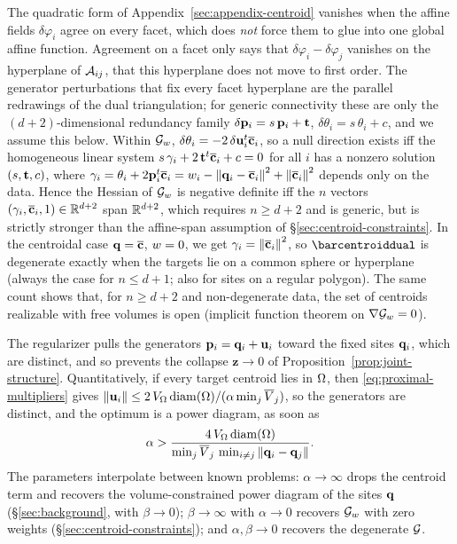 \documentclass[main.tex]{subfiles}
\providecommand{\gen}{\mathbf{z}}                %
\begin{document}
\begin{remark}
\label{rem:centroid-kernel}
The quadratic form of Appendix~\ref{sec:appendix-centroid} vanishes when the affine fields $\delta\varphi_i$ agree on every facet, which does \emph{not} force them to glue into one global affine function.
Agreement on a facet only says that $\delta\varphi_i - \delta\varphi_j$ vanishes on the hyperplane of $\mathcal{A}_{ij}$, \ie that this hyperplane does not move to first order.
The generator perturbations that fix every facet hyperplane are the parallel redrawings of the dual triangulation; for generic connectivity these are only the $(d\!+\!2)$-dimensional redundancy family $\delta\mathbf{p}_i = s\,\mathbf{p}_i + \mathbf{t}$, $\delta\theta_i = s\,\theta_i + c$, and we assume this below.
Within $\mathcal{G}_{w}$, $\delta\theta_i = -2\,\delta\mathbf{u}_i^{t}\overline{\mathbf{c}}_i$, so a null direction exists iff the homogeneous linear system $s\,\gamma_i + 2\,\mathbf{t}^{t}\overline{\mathbf{c}}_i + c = 0$ for all $i$ has a nonzero solution $(s, \mathbf{t}, c)$, where $\gamma_i = \theta_i + 2\mathbf{p}_i^{t}\overline{\mathbf{c}}_i = w_i - \left\lVert \mathbf{q}_i - \overline{\mathbf{c}}_i \right\rVert^2 + \left\lVert \overline{\mathbf{c}}_i \right\rVert^2$ depends only on the data.
Hence the Hessian of $\mathcal{G}_{w}$ is negative definite iff the $n$ vectors $(\gamma_i, \overline{\mathbf{c}}_i, 1) \in \mathbb{R}^{d+2}$ span $\mathbb{R}^{d+2}$, which requires $n \ge d + 2$ and is generic, but is strictly stronger than the affine-span assumption of \S\ref{sec:centroid-constraints}.
In the centroidal case $\mathbf{q} = \overline{\mathbf{c}}$, $w = 0$, we get $\gamma_i = \left\lVert \overline{\mathbf{c}}_i \right\rVert^2$, so $\barcentroiddual$ is degenerate exactly when the targets lie on a common sphere or hyperplane (always the case for $n \le d + 1$; \eg also for sites on a regular polygon).
The same count shows that, for $n \ge d + 2$ and non-degenerate data, the set of centroids realizable with free volumes is open (implicit function theorem on $\nabla\mathcal{G}_{w} = 0$).
\end{remark}

The regularizer pulls the generators $\mathbf{p}_i = \mathbf{q}_i + \mathbf{u}_i$ toward the fixed sites $\mathbf{q}_i$, which are distinct, and so prevents the collapse $\gen \to 0$ of Proposition~\ref{prop:joint-structure}.
Quantitatively, if every target centroid lies in $\Omega$, then \eqref{eq:proximal-multipliers} gives $\left\lVert \mathbf{u}_i \right\rVert \le 2\,V_{\Omega}\,\mathrm{diam}(\Omega) / (\alpha \min_j \overline{V}_j)$, so the generators are distinct, and the optimum is a power diagram, as soon as
\begin{equation}
  \alpha > \frac{4\,V_{\Omega}\,\mathrm{diam}(\Omega)}{\min_j \overline{V}_j \, \min_{i \neq j} \left\lVert \mathbf{q}_i - \mathbf{q}_j \right\rVert} .
  \label{eq:alpha-bound}
\end{equation}
The parameters interpolate between known problems:
$\alpha \to \infty$ drops the centroid term and recovers the volume-constrained power diagram of the sites $\mathbf{q}$ (\S\ref{sec:background}, with $\beta \to 0$);
$\beta \to \infty$ with $\alpha \to 0$ recovers $\mathcal{G}_{w}$ with zero weights (\S\ref{sec:centroid-constraints});
and $\alpha, \beta \to 0$ recovers the degenerate $\mathcal{G}$.
\end{document}
